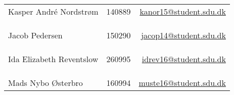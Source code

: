 \documentclass[../main.tex]{subfiles}
\begin{document}
\begin{center}
\begin{tabular}{ l  c  r }
\hline
Kasper André Nordstrøm 	& 140889 &  	\href{mailto:kanor15@student.sdu.dk}{kanor15@student.sdu.dk}\\
\multicolumn{3}{c}{}\\
\multicolumn{3}{c}{}\\
\multicolumn{3}{c}{}\\

\hline
Jacob Pedersen 			& 150290 &	\href{mailto:jacop14@student.sdu.dk}{jacop14@student.sdu.dk}\\
\multicolumn{3}{c}{}\\
\multicolumn{3}{c}{}\\
\multicolumn{3}{c}{}\\

\hline
Ida Elizabeth Reventslow	& 260995 &	\href{mailto:idrev16@student.sdu.dk}{idrev16@student.sdu.dk}\\
\multicolumn{3}{c}{}\\
\multicolumn{3}{c}{}\\
\multicolumn{3}{c}{}\\

\hline
Mads Nybo Østerbro 		& 160994 &	\href{mailto:muste16@student.sdu.dk}{muste16@student.sdu.dk}\\

\end{tabular}
\end{center}
\end{document}
